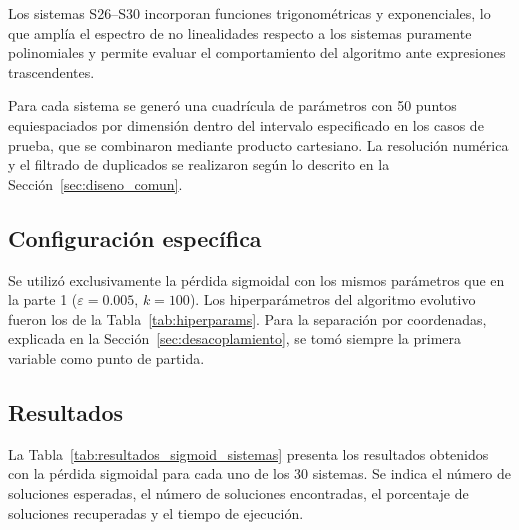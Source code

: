 Los sistemas S26--S30 incorporan funciones trigonométricas y exponenciales, lo que amplía el espectro de no linealidades respecto a los sistemas puramente polinomiales y permite evaluar el comportamiento del algoritmo ante expresiones trascendentes.

Para cada sistema se generó una cuadrícula de parámetros con 50 puntos equiespaciados por dimensión dentro del intervalo especificado en los casos de prueba, que se combinaron mediante producto cartesiano. La resolución numérica y el filtrado de duplicados se realizaron según lo descrito en la Sección~\ref{sec:diseno_comun}.

\subsection{Configuración específica}

Se utilizó exclusivamente la pérdida sigmoidal con los mismos parámetros que en la parte 1 ($\varepsilon = 0.005$, $k = 100$). Los hiperparámetros del algoritmo evolutivo fueron los de la Tabla~\ref{tab:hiperparams}. Para la separación por coordenadas, explicada en la Sección~\ref{sec:desacoplamiento}, se tomó siempre la primera variable como punto de partida.

\subsection{Resultados} \label{sec:resultados_fase2}

La Tabla~\ref{tab:resultados_sigmoid_sistemas} presenta los resultados obtenidos con la pérdida sigmoidal para cada uno de los 30 sistemas. Se indica el número de soluciones esperadas, el número de soluciones encontradas, el porcentaje de soluciones recuperadas y el tiempo de ejecución.

